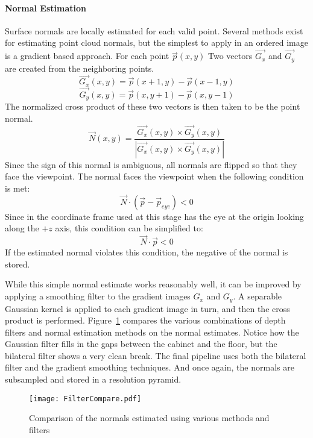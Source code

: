 \paragraph{Normal Estimation}
Surface normals are locally estimated for each valid point. Several methods exist for estimating point cloud normals, but the simplest to apply in an ordered image is a gradient based approach. For each point $\vec{p}(x,y)$ Two vectors $\vec{G_x}$ and $\vec{G_y}$ are created from the neighboring points. $$\vec{G_x}(x,y)=\vec{p}(x+1,y)-\vec{p}(x-1,y)$$ $$\vec{G_y}(x,y)=\vec{p}(x,y+1)-\vec{p}(x,y-1)$$
The normalized cross product of these two vectors is then taken to be the point normal. $$\vec{N}(x,y)= \frac{\vec{G_x}(x,y) \times \vec{G_y}(x,y)}{|\vec{G_x}(x,y) \times \vec{G_y}(x,y)|}$$
Since the sign of this normal is ambiguous, all normals are flipped so that they face the viewpoint. The normal faces the viewpoint when the following condition is met: $$\vec{N} \cdot (\vec{p}-\vec{p}_{eye}) < 0$$
Since in the coordinate frame used at this stage has the eye at the origin looking along the $+z$ axis, this condition can be simplified to: $$\vec{N} \cdot \vec{p} < 0$$
If the estimated normal violates this condition, the negative of the normal is stored.\par
While this simple normal estimate works reasonably well, it can be improved by applying a smoothing filter to the gradient images $G_x$ and $G_y$. A separable Gaussian kernel is applied to each gradient image in turn, and then the cross product is performed. Figure~\ref{fig:filtercompare} compares the various combinations of depth filters and normal estimation methods on the normal estimates. Notice how the Gaussian filter fills in the gaps between the cabinet and the floor, but the bilateral filter shows a very clean break. The final pipeline uses both the bilateral filter and the gradient smoothing techniques. And once again, the normals are subsampled and stored in a resolution pyramid.

\begin{figure}[!htbp]
    \centering
    \texttt{[image: FilterCompare.pdf]}
    \caption{Comparison of the normals estimated using various methods and filters}
    \label{fig:filtercompare}
\end{figure}

